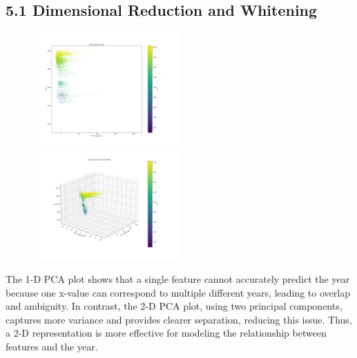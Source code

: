 \documentclass[12pt]{article}
\begin{document}
\subsection*{5.1 Dimensional Reduction and Whitening}

\begin{figure}[H]
    \centering
    \includegraphics[width=0.5\textwidth]{plot.png}
    \includegraphics[width=0.5\textwidth]{plot2.png}
\end{figure} 

The 1-D PCA plot shows that a single feature cannot accurately predict the year because one x-value can correspond to multiple different years, leading to overlap and ambiguity. In contrast, the 2-D PCA plot, using two principal components, captures more variance and provides clearer separation, reducing this issue. Thus, a 2-D representation is more effective for modeling the relationship between features and the year.
\end{document}
